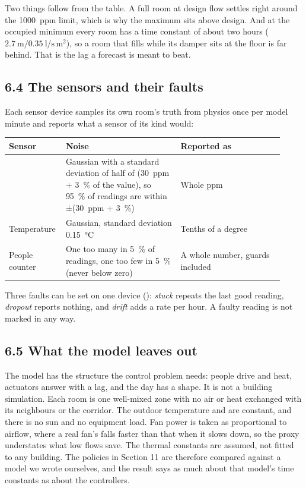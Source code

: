 Two things follow from the table. A full room at design flow settles right
around the 1000~ppm limit, which is why the maximum sits above design. And at
the occupied minimum every room has a time constant of about two hours
($2.7\ \mathrm{m} / 0.35\ \mathrm{l/s\,m^2}$), so a room that fills while its
damper sits at the floor is far behind. That is the lag a forecast is meant to
beat.

\subsection{6.4 The sensors and their faults}

Each sensor device samples its own room's truth from physics once per model
minute and reports what a sensor of its kind would:

\begin{longtable}[]{@{}L{0.16\linewidth}L{0.40\linewidth}L{0.36\linewidth}@{}}
\toprule
\textbf{Sensor} & \textbf{Noise} & \textbf{Reported as} \\
\midrule
\endhead
\COtwo{} & Gaussian with a standard deviation of half of (30~ppm + 3~\% of the value), so 95~\% of readings are within ±(30~ppm + 3~\%) & Whole ppm \\
Temperature & Gaussian, standard deviation 0.15~°C & Tenths of a degree \\
People counter & One too many in 5~\% of readings, one too few in 5~\% (never below zero) & A whole number, guards included \\
\bottomrule
\end{longtable}

Three faults can be set on one device ():
\emph{stuck} repeats the last good reading, \emph{dropout} reports nothing, and
\emph{drift} adds a rate per hour. A faulty reading is not marked in any way.

\subsection{6.5 What the model leaves out}

The model has the structure the control problem needs: people drive \COtwo{}
and heat, actuators answer with a lag, and the day has a shape. It is not a
building simulation. Each room is one well-mixed zone with no air or heat
exchanged with its neighbours or the corridor. The outdoor temperature and
\COtwo{} are constant, and there is no sun and no equipment load. Fan power is
taken as proportional to airflow, where a real fan's falls faster than that
when it slows down, so the proxy understates what low flows save. The thermal
constants are assumed, not fitted to any building. The policies in Section 11
are therefore compared against a model we wrote ourselves, and the result says
as much about that model's time constants as about the controllers.
